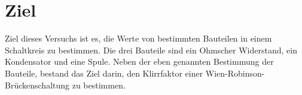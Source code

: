 \section{Ziel}
\label{sec:Ziel}
Ziel dieses Versuchs ist es, die Werte von bestimmten Bauteilen in einem Schaltkreis zu bestimmen. Die drei Bauteile sind ein Ohmscher Widerstand, ein Kondensator
und eine Spule. Neben der eben genannten Bestimmung der Bauteile, bestand das Ziel darin, den Klirrfaktor einer Wien-Robinson-Brückenschaltung zu bestimmen.
